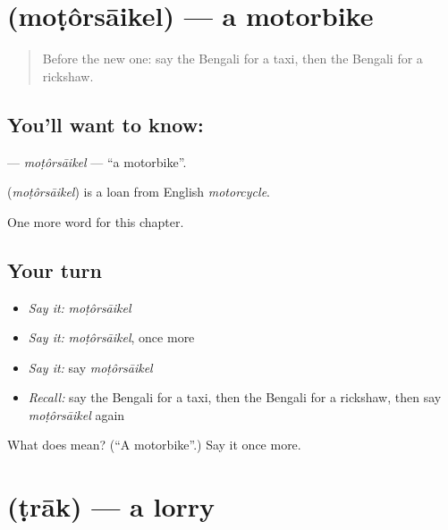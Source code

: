 \section[\texorpdfstring{\bn{মোটরসাইকেল} (moṭôrsāikel)}{মোটরসাইকেল (moṭôrsāikel)}]{ (moṭôrsāikel) — a motorbike}

\label{lesson:BN-C167-motorsaikel}



\begin{quote}
Before the new one: say the Bengali for a taxi, then the Bengali for a rickshaw.
\end{quote}

\subsection*{You'll want to know: }
\textbf{} — \emph{moṭôrsāikel} — \textquotedblleft{}a motorbike\textquotedblright{}.

\begin{cousinweb}
\textbf{} (\emph{moṭôrsāikel}) is a loan from English \emph{motorcycle}.
\end{cousinweb}

\begin{grammarlens}[title={What you've built}]
One more word for this chapter.
\end{grammarlens}

\subsection*{Your turn}
\begin{itemize}
\raggedright
  \item \emph{Say it:} \emph{moṭôrsāikel}
  \item \emph{Say it:} \emph{moṭôrsāikel}, once more
  \item \emph{Say it:} say \emph{moṭôrsāikel}
  \item \emph{Recall:} say the Bengali for a taxi, then the Bengali for a rickshaw, then say \emph{moṭôrsāikel} again
\end{itemize}

\begin{tcolorbox}[breakable,colback=teal!4,colframe=teal!35!black,title={Before you move on}]
What does  mean? (\textquotedblleft{}A motorbike\textquotedblright{}.) Say it once more.
\end{tcolorbox}
\section[\texorpdfstring{\bn{ট্রাক} (ṭrāk)}{ট্রাক (ṭrāk)}]{ (ṭrāk) — a lorry}

